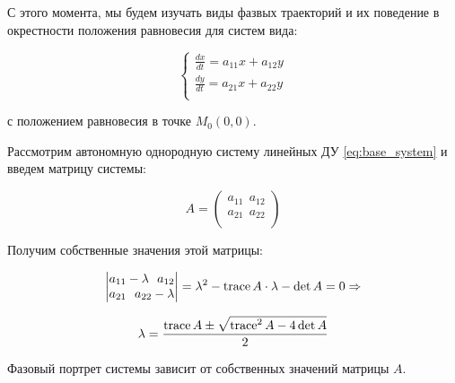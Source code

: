 \documentclass[a4paper, 12pt]{article}
\begin{document}
    С этого момента, мы будем изучать виды фазвых траекторий и их поведение в окрестности положения равновесия для систем вида:

    \begin{equation} \label{eq:base_system}
      \begin{cases}
        \frac{d x}{d t} = a_{11} x + a_{12} y \\
        \frac{d y}{d t} = a_{21} x + a_{22} y \\        
      \end{cases}
    \end{equation}

    с положением равновесия в точке $M_0(0, 0)$.

    Рассмотрим автономную однородную систему линейных ДУ \eqref{eq:base_system} и введем матрицу системы:
    
    \begin{equation}
      A = 
      \begin{pmatrix}
        a_{11} ~~ a_{12} \\
        a_{21} ~~ a_{22} \\
      \end{pmatrix}
    \end{equation}

    Получим собственные значения этой матрицы:

    \begin{equation}
      \begin{vmatrix}
        a_{11} - \lambda ~~ a_{12} \\
        a_{21} ~~ a_{22} - \lambda \\
      \end{vmatrix} = 
      \lambda^2 - \operatorname{trace} A \cdot \lambda - \det A = 0 \Rightarrow
    \end{equation}

    \[ \lambda = \frac{\operatorname{trace} A \pm \sqrt{\operatorname{trace}^2 A - 4 \det A}}{2} \]

    Фазовый портрет системы зависит от собственных значений матрицы $A$.
\end{document}
